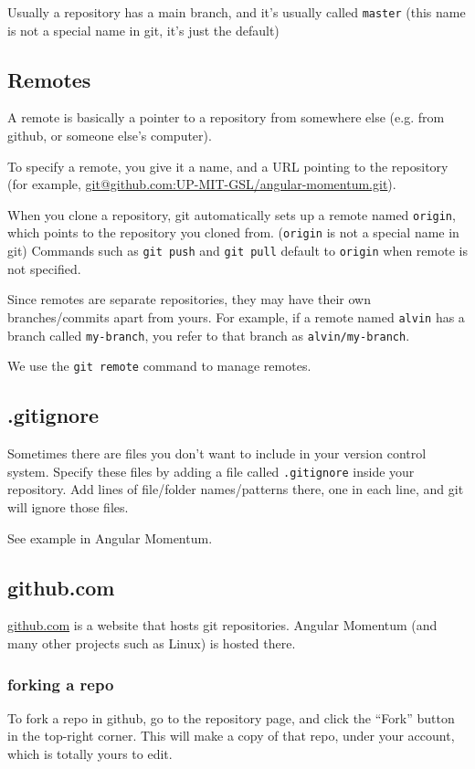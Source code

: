 \documentclass[12pt]{article}
\begin{document}
Usually a repository has a main branch, and it's usually called \texttt{master} (this name is not a special name in git, it's just the default)

\subsection{Remotes}
A remote is basically a pointer to a repository from somewhere else (e.g. from github, or someone else's computer).

To specify a remote, you give it a name, and a URL pointing to the repository (for example, \url{git@github.com:UP-MIT-GSL/angular-momentum.git}).

When you clone a repository, git automatically sets up a remote named \texttt{origin}, which points to the repository you cloned from. (\texttt{origin} is not a special name in git) Commands such as \texttt{git push} and \texttt{git pull} default to \texttt{origin} when remote is not specified.

Since remotes are separate repositories, they may have their own branches/commits apart from yours. For example, if a remote named \texttt{alvin} has a branch called \texttt{my-branch}, you refer to that branch as \texttt{alvin/my-branch}.

We use the \texttt{git remote} command to manage remotes.

\subsection{.gitignore}
Sometimes there are files you don't want to include in your version control system. Specify these files by adding a file called \texttt{.gitignore} inside your repository. Add lines of file/folder names/patterns there, one in each line, and git will ignore those files.

See example in Angular Momentum.

\subsection{github.com}
\url{github.com} is a website that hosts git repositories. Angular Momentum (and many other projects such as Linux) is hosted there.

\subsubsection{forking a repo}
To fork a repo in github, go to the repository page, and click the ``Fork'' button in the top-right corner. This will make a copy of that repo, under your account, which is totally yours to edit.
\end{document}

